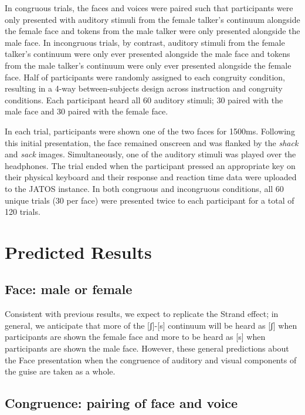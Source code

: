 \documentclass[
  letterpaper,
  DIV=11,
  numbers=noendperiod]{scrartcl}
\begin{document}
In congruous trials, the faces and voices were paired such that
participants were only presented with auditory stimuli from the female
talker's continuum alongside the female face and tokens from the male
talker were only presented alongside the male face. In incongruous
trials, by contrast, auditory stimuli from the female talker's continuum
were only ever presented alongside the male face and tokens from the
male talker's continuum were only ever presented alongside the female
face. Half of participants were randomly assigned to each congruity
condition, resulting in a 4-way between-subjects design across
instruction and congruity conditions. Each participant heard all 60
auditory stimuli; 30 paired with the male face and 30 paired with the
female face.

In each trial, participants were shown one of the two faces for 1500ms.
Following this initial presentation, the face remained onscreen and was
flanked by the \emph{shack} and \emph{sack} images. Simultaneously, one
of the auditory stimuli was played over the headphones. The trial ended
when the participant pressed an appropriate key on their physical
keyboard and their response and reaction time data were uploaded to the
JATOS instance. In both congruous and incongruous conditions, all 60
unique trials (30 per face) were presented twice to each participant for
a total of 120 trials.

\section{Predicted Results}\label{predicted-results}

\subsection{Face: male or female}\label{face-male-or-female}

Consistent with previous results, we expect to replicate the Strand
effect; in general, we anticipate that more of the {[}ʃ{]}-{[}s{]}
continuum will be heard as {[}ʃ{]} when participants are shown the
female face and more to be heard as {[}s{]} when participants are shown
the male face. However, these general predictions about the Face
presentation when the congruence of auditory and visual components of
the guise are taken as a whole.

\subsection{Congruence: pairing of face and
voice}\label{congruence-pairing-of-face-and-voice}
\end{document}

